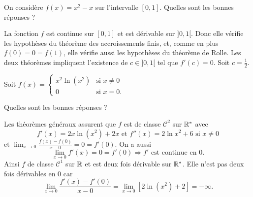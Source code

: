 \begin{question}

On considère $\displaystyle f(x)=x^2-x$ sur l'intervalle $[0,1]$. Quelles sont les bonnes réponses ?
\begin{answers}  
\end{answers}
\begin{explanations}
La fonction $f$ est continue sur $[0,1]$ et est dérivable sur $]0,1[$. Donc elle vérifie les hypothèses du théorème des accroissements finis, et, comme en plus $f(0)=0=f(1)$, elle vérifie aussi les hypothèses du théorème de Rolle. Les deux théorèmes impliquent l'existence de $c\in ]0,1[$ tel que $f'(c)=0$. Soit $\displaystyle c=\frac{1}{2}$.
\end{explanations}
\end{question}



\begin{question}

Soit $f(x)=\left\{\begin{array}{ll}x^2\ln (x^2)&\mbox{si }x\neq 0\\ 0&\mbox{si }x=0.\end{array} \right.$

Quelles sont les bonnes réponses ?
\begin{answers}  
\end{answers}
\begin{explanations}
Les théorèmes généraux assurent que $f$ est de classe $\mathscr{C}^2$ sur $\mathbb{R}^*$ avec
$$f'(x)=2x\ln (x^2)+2x\mbox{ et }f''(x)=2\ln x^2+6\mbox{ si }x\neq 0$$
et $\displaystyle \lim _{x\to 0}\frac{f(x)-f(0)}{x-0}=0=f'(0)$. On a aussi
$$\lim _{x\to 0}f'(x)=0=f'(0) \Rightarrow f'\mbox{ est continue en }0.$$
Ainsi $f$ de classe $\mathscr{C}^1$ sur $\mathbb{R}$ et est deux fois dérivable sur $\mathbb{R}^*$. Elle n'est pas deux fois dérivables en $0$ car
$$\lim _{x\to 0}\frac{f'(x)-f'(0)}{x-0}=\lim _{x\to 0}[2\ln (x^2)+2]=-\infty.$$
\end{explanations}
\end{question}



